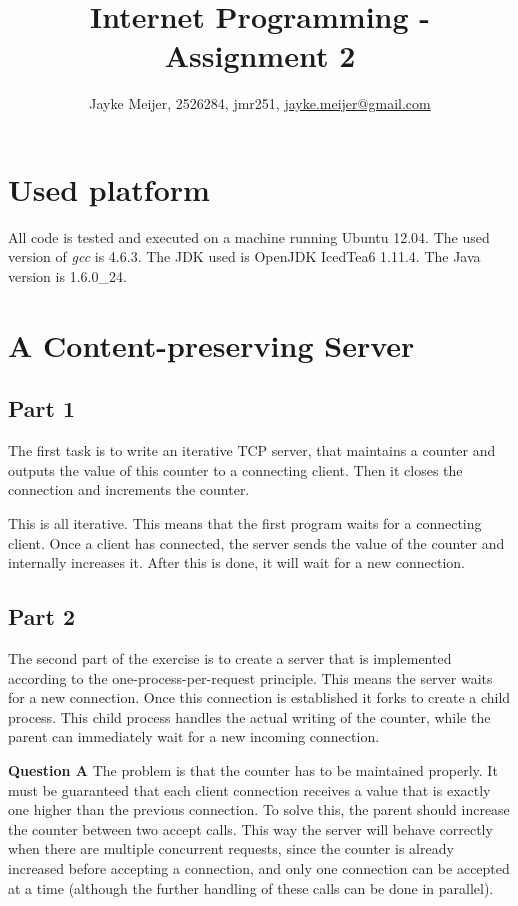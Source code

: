 \documentclass[a4paper]{article}
\title{Internet Programming - Assignment 2}
\author{Jayke Meijer, 2526284, jmr251, \url{jayke.meijer@gmail.com}}
\begin{document}
\maketitle

\tableofcontents
\pagebreak

\section{Used platform}

All code is tested and executed on a machine running Ubuntu 12.04. The used version of
\emph{gcc} is 4.6.3. The JDK used is OpenJDK IcedTea6 1.11.4. The Java version is
1.6.0\_24.

\section{A Content-preserving Server}

\subsection{Part 1}

The first task is to write an iterative TCP server, that maintains a counter and outputs
the value of this counter to a connecting client. Then it closes the connection and
increments the counter.

This is all iterative. This means that the first program waits for a connecting client. 
Once a client has connected, the server sends the value of the counter and internally 
increases it. After this is done, it will wait for a new connection.

\subsection{Part 2}

The second part of the exercise is to create a server that is implemented according to the
one-process-per-request principle. This means the server waits for a new connection. Once
this connection is established it forks to create a child process. This child process
handles the actual writing of the counter, while the parent can immediately wait for a new
incoming connection.

\textbf{Question A} The problem is that the counter has to be maintained properly. It must
be guaranteed that each client connection receives a value that is exactly one higher than
the previous connection. To solve this, the parent should increase the counter between two
accept calls. This way the server will behave correctly when there are multiple concurrent
requests, since the counter is already increased before accepting a connection, and only
one connection can be accepted at a time (although the further handling of these
calls can be done in parallel).
\end{document}
